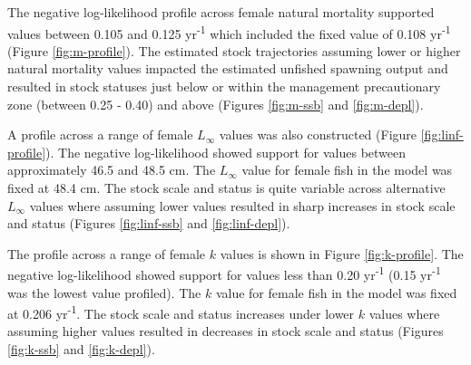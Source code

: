 \documentclass[11pt,
  english,
  a4paper,
]{article}
\begin{document}
\leavevmode\tagmcend\tagstructend\par


The negative log-likelihood profile across female natural mortality supported values between 0.105 and 0.125 yr\textsuperscript{-1} which included the fixed value of 0.108 yr\textsuperscript{-1} (Figure \ref{fig:m-profile}). The estimated stock trajectories assuming lower or higher natural mortality values impacted the estimated unfished spawning output and resulted in stock statuses just below or within the management precautionary zone (between 0.25 - 0.40) and above (Figures \ref{fig:m-ssb} and \ref{fig:m-depl}).

\leavevmode\tagmcend\tagstructend\par


A profile across a range of female {\(L_{\infty}\)\leavevmode\tagmcend\tagstructend} values was also constructed (Figure \ref{fig:linf-profile}). The negative log-likelihood showed support for values between approximately 46.5 and 48.5 cm. The {\(L_{\infty}\)\leavevmode\tagmcend\tagstructend} value for female fish in the model was fixed at 48.4 cm. The stock scale and status is quite variable across alternative {\(L_{\infty}\)\leavevmode\tagmcend\tagstructend} values where assuming lower values resulted in sharp increases in stock scale and status (Figures \ref{fig:linf-ssb} and \ref{fig:linf-depl}).

\leavevmode\tagmcend\tagstructend\par


The profile across a range of female {\(k\)\leavevmode\tagmcend\tagstructend} values is shown in Figure \ref{fig:k-profile}. The negative log-likelihood showed support for values less than 0.20 yr\textsuperscript{-1} (0.15 yr\textsuperscript{-1} was the lowest value profiled). The {\(k\)\leavevmode\tagmcend\tagstructend} value for female fish in the model was fixed at 0.206 yr\textsuperscript{-1}. The stock scale and status increases under lower {\(k\)\leavevmode\tagmcend\tagstructend} values where assuming higher values resulted in decreases in stock scale and status (Figures \ref{fig:k-ssb} and \ref{fig:k-depl}).
\end{document}
